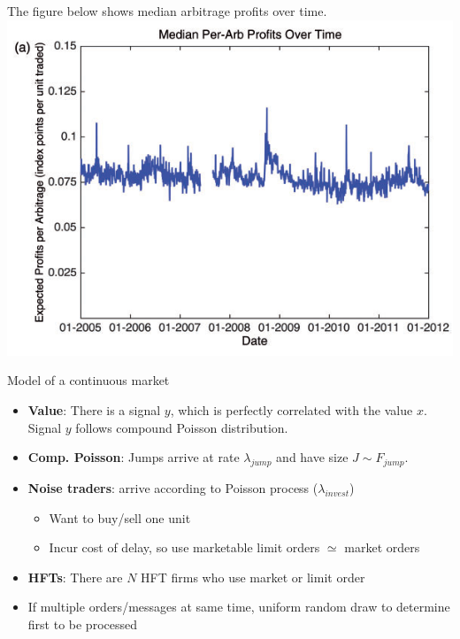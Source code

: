 \documentclass[english,10pt
,aspectratio=169
]{beamer}
\begin{document}
\begin{frame}{\citet*{budish_high-frequency_2015}}
	The figure below shows median arbitrage profits over time.
	\center
	\includegraphics[scale=0.7]{pics/HTF_ArbitrageProfitsTime}
\end{frame}


\begin{frame}{Model of a continuous market}
	\begin{itemize}
		\item \textbf{Value}: There is a signal $y$, which is perfectly correlated with the value $x$. Signal $y$ follows compound Poisson distribution.
		\item \textbf{Comp. Poisson}: Jumps arrive at rate $\lambda_{jump}$ and have size $J \sim F_{jump}$.
	\end{itemize}
	\begin{itemize}
		\item \textbf{Noise traders}: arrive according to Poisson process ($\lambda_{invest}$)
		\begin{itemize}
			\item Want to buy/sell one unit
			\item Incur cost of delay, so use marketable limit orders $\simeq$ market orders
		\end{itemize}
		\item \textbf{HFTs}: There are $N$ HFT firms who use market or limit order
	\end{itemize}
	\begin{itemize}
		\item If multiple orders/messages at same time, uniform random draw to determine first to be processed
	\end{itemize}
\end{frame}
\end{document}
